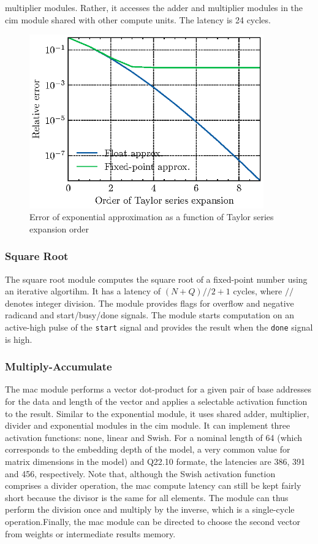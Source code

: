 \documentclass[12pt, hidelinks]{article}
\begin{document}
multiplier modules. Rather, it accesses the adder and multiplier modules in the \ac{cim} module shared with other compute units. The latency is 24 cycles.
\begin{figure}
    \centering
    \caption{Error of exponential approximation as a function of Taylor series expansion order}
    \includegraphics[width=0.9\textwidth]{assets/exp_approx_error.eps}
\end{figure}
\label{fig:exp_error}

\subsubsection{Square Root}
The square root module computes the square root of a fixed-point number using an iterative algortihm. It has a latency of $(N+Q)//2+1$ cycles, where $//$ denotes integer division. The module provides flags for overflow and 
negative radicand and start/busy/done signals. The module starts computation on an active-high pulse of the \texttt{start} signal and provides the result when the \texttt{done} signal is high.

\subsubsection{Multiply-Accumulate}
The \ac{mac} module performs a vector dot-product for a given pair of base addresses for the data and length of the vector and applies a selectable activation function to the result. Similar to the exponential module, it
uses shared adder, multiplier, divider and exponential modules in the \ac{cim} module. It can implement three activation functions: none, linear and Swish. For a nominal length of 64 (which corresponds to the embedding
depth of the model, a very common value for matrix dimensions in the model) and Q22.10 formate, the latencies are 386, 391 and 456, respectively. Note that, although the Swish activation function comprises a divider operation,
the \ac{mac} compute latency can still be kept fairly short because the divisor is the same for all elements. The module can thus perform the division once and multiply by the inverse, which is a single-cycle operation.Finally,
the \ac{mac} module can be directed to choose the second vector from weights or intermediate results memory.
\end{document}
